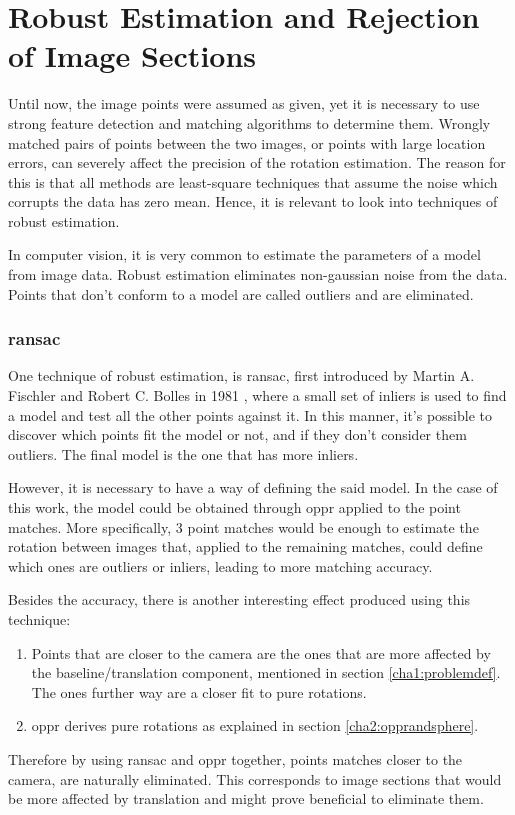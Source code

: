 
\section{Robust Estimation and Rejection of Image Sections}
\label{cha2:robustest}

Until now, the image points were assumed as given, yet it is necessary to use strong feature detection and matching algorithms to determine them. Wrongly matched pairs of points between the two images, or points with large location errors, can severely affect the precision of the rotation estimation. The reason for this is that all methods are least-square techniques that assume the noise which corrupts the data has zero mean. Hence, it is relevant to look into techniques of robust estimation.

In computer vision, it is very common to estimate the parameters of a model from image data. Robust estimation eliminates non-gaussian noise from the data. Points that don’t conform to a model are called outliers and are eliminated.

\subsubsection{\acrlong{ransac}}

One technique of robust estimation, is \acrfull{ransac}, first introduced by Martin A. Fischler and Robert C. Bolles in 1981 \cite{ransac}, where a small set of inliers is used to find a model and test all the 
other points against it. In this manner, it's possible to discover which points fit the model or not, and if they don’t consider them outliers. The final model is the one that has more inliers. 

However, it is necessary to have a way of defining the said model. In the case of this work, the model could be obtained through \acrlong{oppr} applied to the point matches. More specifically, 3 point matches would be enough to estimate the rotation between images that, applied to the remaining matches, could define which ones are outliers or inliers, leading to more matching accuracy.

Besides the accuracy, there is another interesting effect produced using this technique:

\begin{enumerate}
\item Points that are closer to the camera are the ones that are more affected by the baseline/translation component, mentioned in section \ref{cha1:problemdef}. The ones further way are a closer fit to pure rotations.

\item \acrshort{oppr} derives pure rotations as explained in section \ref{cha2:opprandsphere}. 
\end{enumerate}
Therefore by using \acrshort{ransac} and \acrshort{oppr} together, points matches closer to the camera, are naturally eliminated. This corresponds to image sections that would be more affected by translation and might prove beneficial to eliminate them. \cite{mono} \\

